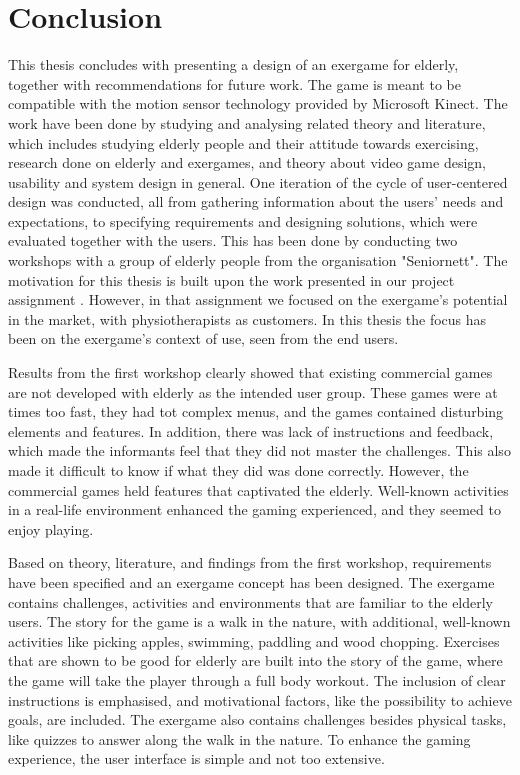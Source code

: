 \chapter{Conclusion}

This thesis concludes with presenting a design of an exergame for elderly, together with recommendations for future work. The game is meant to be compatible with the motion sensor technology provided by Microsoft Kinect. The work have been done by studying and analysing related theory and literature, which includes studying elderly people and their attitude towards exercising, research done on elderly and exergames, and theory about video game design, usability and system design in general. One iteration of the cycle of user-centered design was conducted, all from gathering information about the users' needs and expectations, to specifying requirements and designing solutions, which were evaluated together with the users. This has been done by conducting two workshops with a group of elderly people from the organisation "Seniornett". The motivation for this thesis is built upon the work presented in our project assignment \cite{project}. However, in that assignment we focused on the exergame's potential in the market, with physiotherapists as customers. In this thesis the focus has been on the exergame's context of use, seen from the end users. 

Results from the first workshop clearly showed that existing commercial games are not developed with elderly as the intended user group. These games were at times too fast, they had tot complex menus, and the games contained disturbing elements and features. In addition, there was lack of instructions and feedback, which made the informants feel that they did not master the challenges. This also made it difficult to know if what they did was done correctly. However, the commercial games held features that captivated the elderly. Well-known activities in a real-life environment enhanced the gaming experienced, and they seemed to enjoy playing. 

Based on theory, literature, and findings from the first workshop, requirements have been specified and an exergame concept has been designed. The exergame contains challenges, activities and environments that are familiar to the elderly users. The story for the game is a walk in the nature, with additional, well-known activities like picking apples, swimming, paddling and wood chopping. Exercises that are shown to be good for elderly are built into the story of the game, where the game will take the player through a full body workout. The inclusion of clear instructions is emphasised, and motivational factors, like the possibility to achieve goals, are included. The exergame also contains challenges besides physical tasks, like quizzes to answer along the walk in the nature. To enhance the gaming experience, the user interface is simple and not too extensive.

